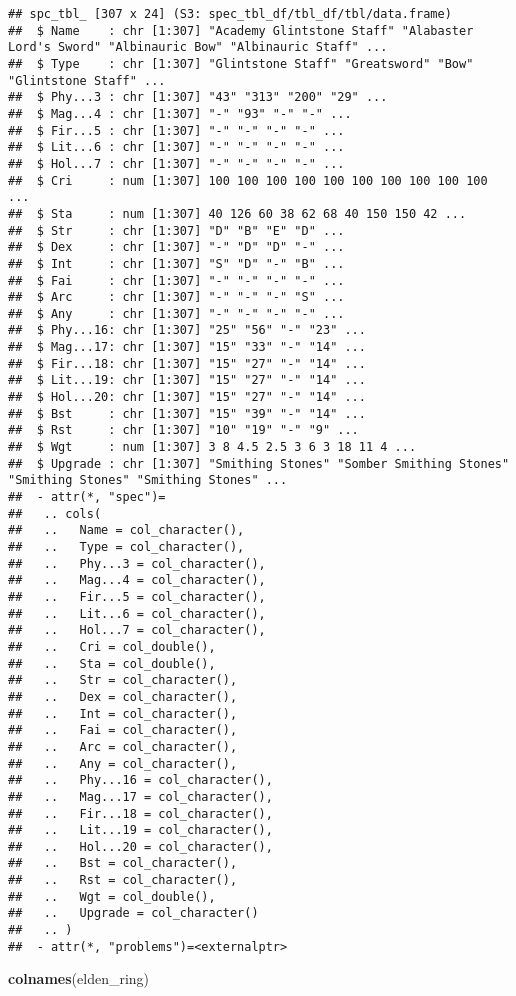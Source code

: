\documentclass[
]{article}
\newenvironment{Shaded}{\begin{snugshade}}{\end{snugshade}}
\newcommand{\FunctionTok}[1]{\textcolor[rgb]{0.13,0.29,0.53}{\textbf{#1}}}
\newcommand{\NormalTok}[1]{#1}
\begin{document}
\begin{verbatim}
## spc_tbl_ [307 x 24] (S3: spec_tbl_df/tbl_df/tbl/data.frame)
##  $ Name    : chr [1:307] "Academy Glintstone Staff" "Alabaster Lord's Sword" "Albinauric Bow" "Albinauric Staff" ...
##  $ Type    : chr [1:307] "Glintstone Staff" "Greatsword" "Bow" "Glintstone Staff" ...
##  $ Phy...3 : chr [1:307] "43" "313" "200" "29" ...
##  $ Mag...4 : chr [1:307] "-" "93" "-" "-" ...
##  $ Fir...5 : chr [1:307] "-" "-" "-" "-" ...
##  $ Lit...6 : chr [1:307] "-" "-" "-" "-" ...
##  $ Hol...7 : chr [1:307] "-" "-" "-" "-" ...
##  $ Cri     : num [1:307] 100 100 100 100 100 100 100 100 100 100 ...
##  $ Sta     : num [1:307] 40 126 60 38 62 68 40 150 150 42 ...
##  $ Str     : chr [1:307] "D" "B" "E" "D" ...
##  $ Dex     : chr [1:307] "-" "D" "D" "-" ...
##  $ Int     : chr [1:307] "S" "D" "-" "B" ...
##  $ Fai     : chr [1:307] "-" "-" "-" "-" ...
##  $ Arc     : chr [1:307] "-" "-" "-" "S" ...
##  $ Any     : chr [1:307] "-" "-" "-" "-" ...
##  $ Phy...16: chr [1:307] "25" "56" "-" "23" ...
##  $ Mag...17: chr [1:307] "15" "33" "-" "14" ...
##  $ Fir...18: chr [1:307] "15" "27" "-" "14" ...
##  $ Lit...19: chr [1:307] "15" "27" "-" "14" ...
##  $ Hol...20: chr [1:307] "15" "27" "-" "14" ...
##  $ Bst     : chr [1:307] "15" "39" "-" "14" ...
##  $ Rst     : chr [1:307] "10" "19" "-" "9" ...
##  $ Wgt     : num [1:307] 3 8 4.5 2.5 3 6 3 18 11 4 ...
##  $ Upgrade : chr [1:307] "Smithing Stones" "Somber Smithing Stones" "Smithing Stones" "Smithing Stones" ...
##  - attr(*, "spec")=
##   .. cols(
##   ..   Name = col_character(),
##   ..   Type = col_character(),
##   ..   Phy...3 = col_character(),
##   ..   Mag...4 = col_character(),
##   ..   Fir...5 = col_character(),
##   ..   Lit...6 = col_character(),
##   ..   Hol...7 = col_character(),
##   ..   Cri = col_double(),
##   ..   Sta = col_double(),
##   ..   Str = col_character(),
##   ..   Dex = col_character(),
##   ..   Int = col_character(),
##   ..   Fai = col_character(),
##   ..   Arc = col_character(),
##   ..   Any = col_character(),
##   ..   Phy...16 = col_character(),
##   ..   Mag...17 = col_character(),
##   ..   Fir...18 = col_character(),
##   ..   Lit...19 = col_character(),
##   ..   Hol...20 = col_character(),
##   ..   Bst = col_character(),
##   ..   Rst = col_character(),
##   ..   Wgt = col_double(),
##   ..   Upgrade = col_character()
##   .. )
##  - attr(*, "problems")=<externalptr>
\end{verbatim}

\begin{Shaded}
\begin{Highlighting}[]
\FunctionTok{colnames}\NormalTok{(elden\_ring)}
\end{Highlighting}
\end{Shaded}
\end{document}
